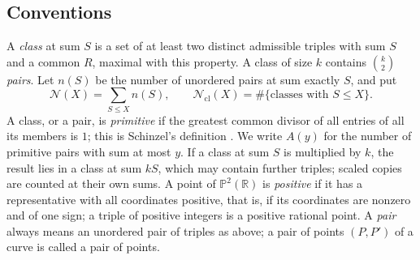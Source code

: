 \documentclass[11pt]{amsart}
\theoremstyle{definition}
\theoremstyle{remark}
\newcommand{\R}{\mathbb{R}}
\newcommand{\PP}{\mathbb{P}}
\newcommand{\N}{\mathcal{N}}
\newcommand{\Ncl}{\mathcal{N}_{\mathrm{cl}}}
\begin{document}
\subsection{Conventions}\label{sec:conventions}
A \emph{class} at sum $S$ is a set of at least two distinct admissible triples with sum $S$ and a common $R$, maximal with this property. A class of size $k$ contains $\binom k2$ \emph{pairs}. Let $n(S)$ be the number of unordered pairs at sum exactly $S$, and put
\begin{equation}\label{eq:counts}
  \N(X)=\sum_{S\le X}n(S),\qquad \Ncl(X)=\#\{\text{classes with }S\le X\}.
\end{equation}
A class, or a pair, is \emph{primitive} if the greatest common divisor of all entries of all its members is $1$; this is Schinzel's definition \cite[p.~587]{schinzel1996}. We write $A(y)$ for the number of primitive pairs with sum at most $y$. If a class at sum $S$ is multiplied by $k$, the result lies in a class at sum $kS$, which may contain further triples; scaled copies are counted at their own sums. A point of $\PP^2(\R)$ is \emph{positive} if it has a representative with all coordinates positive, that is, if its coordinates are nonzero and of one sign; a triple of positive integers is a positive rational point. A \emph{pair} always means an unordered pair of triples as above; a pair of points $(P,P')$ of a curve is called a pair of points.
\end{document}
